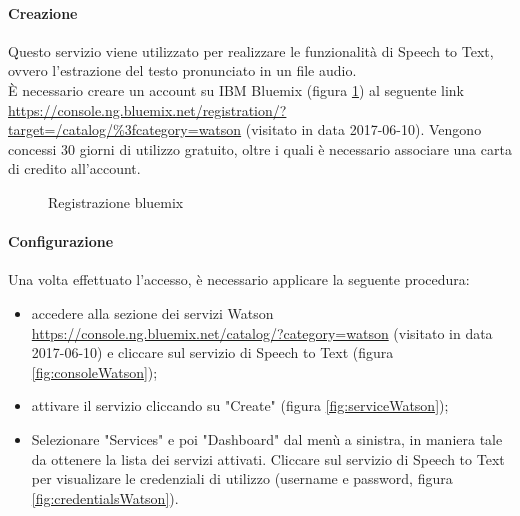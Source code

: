 \paragraph{Creazione}
Questo servizio viene utilizzato per realizzare le funzionalità di Speech to Text, ovvero l'estrazione del testo pronunciato in un file audio.\\
È necessario creare un account su IBM Bluemix (figura \ref{fig:bluemix}) al seguente link \url{https://console.ng.bluemix.net/registration/?target=/catalog/\%3fcategory=watson} (visitato in data 2017-06-10). Vengono concessi 30 giorni di utilizzo gratuito, oltre i quali è necessario associare una carta di credito all'account.
\begin{figure}[h]
	\caption{Registrazione bluemix}\label{fig:bluemix}
\end{figure}
\paragraph{Configurazione}
Una volta effettuato l'accesso, è necessario applicare la seguente procedura:
\begin{itemize}
	\item accedere alla sezione dei servizi Watson \url{https://console.ng.bluemix.net/catalog/?category=watson} (visitato in data 2017-06-10) e cliccare sul servizio di Speech to Text (figura \ref{fig:consoleWatson});
	\item attivare il servizio cliccando su "Create" (figura \ref{fig:serviceWatson});
	\item Selezionare "Services" e poi "Dashboard" dal menù a sinistra, in maniera tale da ottenere la lista dei servizi attivati. Cliccare sul servizio di Speech to Text per visualizare le credenziali di utilizzo (username e password, figura \ref{fig:credentialsWatson}).
\end{itemize}

